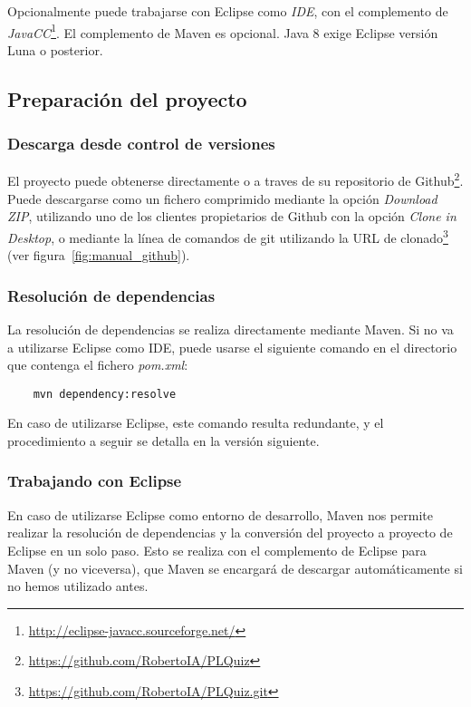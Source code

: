 Opcionalmente puede trabajarse con Eclipse como \emph{IDE}, con el complemento de \emph{JavaCC}\footnote{\url{http://eclipse-javacc.sourceforge.net/}}.
El complemento de Maven es opcional.
Java 8 exige Eclipse versión Luna o posterior.

\subsection{Preparación del proyecto}
\subsubsection{Descarga desde control de versiones}
El proyecto puede obtenerse directamente o a traves de su repositorio de Github\footnote{\url{https://github.com/RobertoIA/PLQuiz}}. Puede descargarse como un fichero comprimido mediante la opción \emph{Download ZIP}, utilizando uno de los clientes propietarios de Github con la opción \emph{Clone in Desktop}, o mediante la línea de comandos de git utilizando la URL de clonado\footnote{\url{https://github.com/RobertoIA/PLQuiz.git}} (ver figura~\ref{fig:manual_github}).


\subsubsection{Resolución de dependencias}
La resolución de dependencias se realiza directamente mediante Maven.
Si no va a utilizarse Eclipse como IDE, puede usarse el siguiente comando en el directorio que contenga el fichero \emph{pom.xml}:
\begin{verbatim}
	mvn dependency:resolve
\end{verbatim}
En caso de utilizarse Eclipse, este comando resulta redundante, y el procedimiento a seguir se detalla en la versión siguiente.

\subsubsection{Trabajando con Eclipse}
En caso de utilizarse Eclipse como entorno de desarrollo, Maven nos permite realizar la resolución de dependencias y la conversión del proyecto a proyecto de Eclipse en un solo paso.
Esto se realiza con el complemento de Eclipse para Maven (y no viceversa), que Maven se encargará de descargar automáticamente si no hemos utilizado antes.


